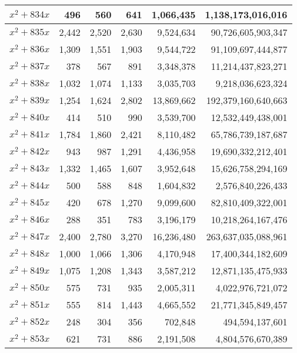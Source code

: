 \documentclass[a4paper]{amsproc}
\theoremstyle{plain}
\begin{document}
\begin{longtable}{ | l | r | r | r | r | r | }
$x^2 + 834x$ & 496 & 560 & 641 & 1{,}066{,}435 & 1{,}138{,}173{,}016{,}016 \\ \hline
$x^2 + 835x$ & 2{,}442 & 2{,}520 & 2{,}630 & 9{,}524{,}634 & 90{,}726{,}605{,}903{,}347 \\ \hline
$x^2 + 836x$ & 1{,}309 & 1{,}551 & 1{,}903 & 9{,}544{,}722 & 91{,}109{,}697{,}444{,}877 \\ \hline
$x^2 + 837x$ & 378 & 567 & 891 & 3{,}348{,}378 & 11{,}214{,}437{,}823{,}271 \\ \hline
$x^2 + 838x$ & 1{,}032 & 1{,}074 & 1{,}133 & 3{,}035{,}703 & 9{,}218{,}036{,}623{,}324 \\ \hline
$x^2 + 839x$ & 1{,}254 & 1{,}624 & 2{,}802 & 13{,}869{,}662 & 192{,}379{,}160{,}640{,}663 \\ \hline
$x^2 + 840x$ & 414 & 510 & 990 & 3{,}539{,}700 & 12{,}532{,}449{,}438{,}001 \\ \hline
$x^2 + 841x$ & 1{,}784 & 1{,}860 & 2{,}421 & 8{,}110{,}482 & 65{,}786{,}739{,}187{,}687 \\ \hline
$x^2 + 842x$ & 943 & 987 & 1{,}291 & 4{,}436{,}958 & 19{,}690{,}332{,}212{,}401 \\ \hline
$x^2 + 843x$ & 1{,}332 & 1{,}465 & 1{,}607 & 3{,}952{,}648 & 15{,}626{,}758{,}294{,}169 \\ \hline
$x^2 + 844x$ & 500 & 588 & 848 & 1{,}604{,}832 & 2{,}576{,}840{,}226{,}433 \\ \hline
$x^2 + 845x$ & 420 & 678 & 1{,}270 & 9{,}099{,}600 & 82{,}810{,}409{,}322{,}001 \\ \hline
$x^2 + 846x$ & 288 & 351 & 783 & 3{,}196{,}179 & 10{,}218{,}264{,}167{,}476 \\ \hline
$x^2 + 847x$ & 2{,}400 & 2{,}780 & 3{,}270 & 16{,}236{,}480 & 263{,}637{,}035{,}088{,}961 \\ \hline
$x^2 + 848x$ & 1{,}000 & 1{,}066 & 1{,}306 & 4{,}170{,}948 & 17{,}400{,}344{,}182{,}609 \\ \hline
$x^2 + 849x$ & 1{,}075 & 1{,}208 & 1{,}343 & 3{,}587{,}212 & 12{,}871{,}135{,}475{,}933 \\ \hline
$x^2 + 850x$ & 575 & 731 & 935 & 2{,}005{,}311 & 4{,}022{,}976{,}721{,}072 \\ \hline
$x^2 + 851x$ & 555 & 814 & 1{,}443 & 4{,}665{,}552 & 21{,}771{,}345{,}849{,}457 \\ \hline
$x^2 + 852x$ & 248 & 304 & 356 & 702{,}848 & 494{,}594{,}137{,}601 \\ \hline
$x^2 + 853x$ & 621 & 731 & 886 & 2{,}191{,}508 & 4{,}804{,}576{,}670{,}389 \\ \hline

\end{longtable}
\end{document}
